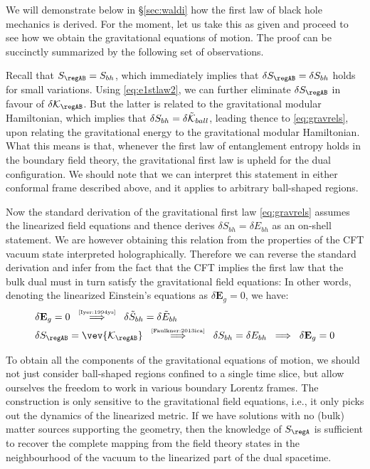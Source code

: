\documentclass[12pt,openany]{book}
\begin{document}
We will demonstrate below in \S\ref{sec:waldi} how the first law of black hole mechanics is derived. For the moment, let us take this as given and proceed to see how we obtain the gravitational equations of motion. The proof can be succinctly summarized by the following set of observations.

Recall that $S_{\regAB} = S_{bh}$, which immediately implies that $\delta S_{\regAB} = \delta S_{bh}$ holds for small variations. Using \eqref{eq:e1stlaw2}, we can further eliminate $\delta S_{\regAB}$ in favour of $\delta{\cal K}_{\regAB}$. But the latter is related to the gravitational modular Hamiltonian, which implies that $\delta S_{bh} = \delta \tilde{{\cal K}}_{ball}$, leading thence to \eqref{eq:gravrels}, upon relating the gravitational  energy to the gravitational modular Hamiltonian. What this means is that, whenever the first law of entanglement entropy holds in the boundary field theory, the gravitational first law is upheld for the dual configuration. We should note that we can interpret this statement in either conformal frame described above, and it applies to arbitrary ball-shaped regions.

Now the standard derivation of the gravitational first law \eqref{eq:gravrels} assumes the linearized field equations and thence derives $\delta S_{bh} =  \delta E_{bh} $ as an on-shell statement. We are however obtaining this relation from the properties of the CFT vacuum state interpreted holographically. Therefore we can reverse the standard derivation and infer from the fact that the CFT implies the  first law that the bulk dual must in turn satisfy the gravitational field equations: In other words, denoting the linearized Einstein's equations as $\delta \mathbf{E}_{g} =0$, we have:
%
\begin{equation}
\begin{split}
&\delta \mathbf{E}_g = 0
\;\; \overset{\text{\tiny{\cite{Iyer:1994ys}}}}{\Longrightarrow}\;\;
\delta \tilde{S}_{bh} =  \delta \tilde{E}_{bh}
 \\
& \delta S_{\regAB} = \vev{{\cal K}_{\regAB}}
\;\; \overset{\text{\tiny{\cite{Faulkner:2013ica}}}}{\Longrightarrow} \;\;
\delta S_{bh} =  \delta E_{bh}
\;\; \Longrightarrow \;\;
\delta \mathbf{E}_g = 0
\end{split}
\label{eq:wiee}
\end{equation}
%

To obtain all the components of the gravitational equations of motion, we should not just consider ball-shaped regions confined to a single time slice, but allow ourselves the freedom to work in various boundary Lorentz frames. The construction is only sensitive  to the gravitational field equations, i.e., it only picks out the dynamics of the linearized metric. If we have solutions with no (bulk) matter sources supporting the geometry, then the knowledge of $S_\regA$ is sufficient to recover the complete mapping from the field theory states in the neighbourhood of the vacuum to the linearized part of the dual spacetime.
\end{document}
